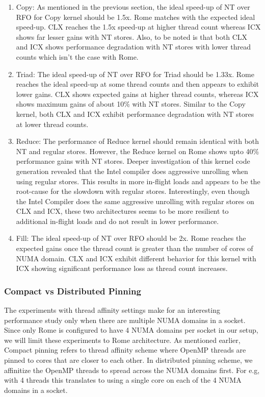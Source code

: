 \documentclass{article}
\begin{document}
\begin{enumerate}
\item Copy: As mentioned in the previous section, the ideal speed-up of NT over RFO for Copy kernel should be 1.5x. Rome matches with the expected ideal speed-up. CLX reaches the 1.5x speed-up at higher thread count whereas ICX shows far lesser gains with NT stores. Also, to be noted is that both CLX and ICX shows performance degradation with NT stores with lower thread counts which isn't the case with Rome.
\item Triad: The ideal speed-up of NT over RFO for Triad should be 1.33x. Rome reaches the ideal speed-up at some thread counts and then appears to exhibit lower gains. CLX shows expected gains at higher thread counts, whereas ICX shows maximum gains of about 10\% with NT stores. Similar to the Copy kernel, both CLX and ICX exhibit performance degradation with NT stores at lower thread counts.
\item Reduce: The performance of Reduce kernel should remain identical with both NT and regular stores. However, the Reduce kernel on Rome shows upto 40\% performance gains with NT stores. Deeper investigation of this kernel code generation revealed that the Intel compiler does aggressive unrolling when using regular stores. This results in more in-flight loads and appears to be the root-cause for the slowdown with regular stores. Interestingly, even though the Intel Compiler does the same aggressive unrolling with regular stores on CLX and ICX, these two architectures seems to be more resilient to additional in-flight loads and do not result in lower performance.
\item Fill: The ideal speed-up of NT over RFO should be 2x. Rome reaches the expected gains once the thread count is greater than the number of cores of NUMA domain. CLX and ICX exhibit different behavior for this kernel with ICX showing significant performance loss as thread count increases.
\end{enumerate}


\subsubsection{Compact vs Distributed Pinning}
The experiments with thread affinity settings make for an interesting performance study only when there are multiple NUMA domains in a socket. Since only Rome is configured to have 4 NUMA domains per socket in our setup, we will limit these experiments to Rome architecture. As mentioned earlier, Compact pinning refers to thread affinity scheme where OpenMP threads are pinned to cores that are closer to each other. In distributed pinning scheme, we affinitize the OpenMP threads to spread across the NUMA domains first. For e.g, with 4 threads this translates to using a single core on each of the 4 NUMA domains in a socket.
\end{document}
